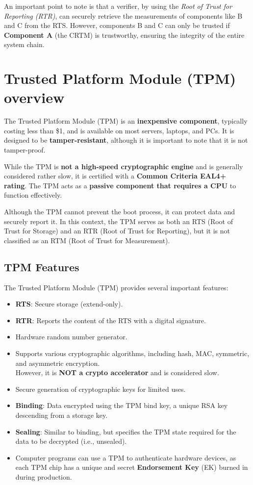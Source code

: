 An important point to note is that a verifier, by using the \textit{Root of Trust for Reporting (RTR)}, can securely retrieve the measurements of components like B and C from the RTS. However, components B and C can only be trusted if \textbf{Component A} (the CRTM) is trustworthy, ensuring the integrity of the entire system chain.


\section{Trusted Platform Module (TPM) overview}

The Trusted Platform Module (TPM) is an \textbf{inexpensive component}, typically costing less than \$1, and is available on most servers, laptops, and PCs. It is designed to be \textbf{tamper-resistant}, although it is important to note that it is not tamper-proof.

While the TPM is\textbf{ not a high-speed cryptographic engine} and is generally considered rather slow, it is certified with a \textbf{Common Criteria EAL4+ rating}. The TPM acts as a \textbf{passive component that requires a CPU} to function effectively.

Although the TPM cannot prevent the boot process, it can protect data and securely report it. In this context, the TPM serves as both an RTS (Root of Trust for Storage) and an RTR (Root of Trust for Reporting), but it is not classified as an RTM (Root of Trust for Measurement).

\subsection{TPM Features}

The Trusted Platform Module (TPM) provides several important features:

\begin{itemize}[left=0pt]
    \item \textbf{RTS}: Secure storage (extend-only).
    \item \textbf{RTR}: Reports the content of the RTS with a digital signature.
    \item Hardware random number generator.
    \item Supports various cryptographic algorithms, including hash, MAC, symmetric, and asymmetric encryption. \\ However, it is \textbf{NOT a crypto accelerator} and is considered slow.
    \item Secure generation of cryptographic keys for limited uses.
    \item \textbf{Binding}: Data encrypted using the TPM bind key, a unique RSA key descending from a storage key.
    \item \textbf{Sealing}: Similar to binding, but specifies the TPM state required for the data to be decrypted (i.e., unsealed).
    \item Computer programs can use a TPM to authenticate hardware devices, as each TPM chip has a unique and secret \textbf{Endorsement Key} (EK) burned in during production.
\end{itemize}

